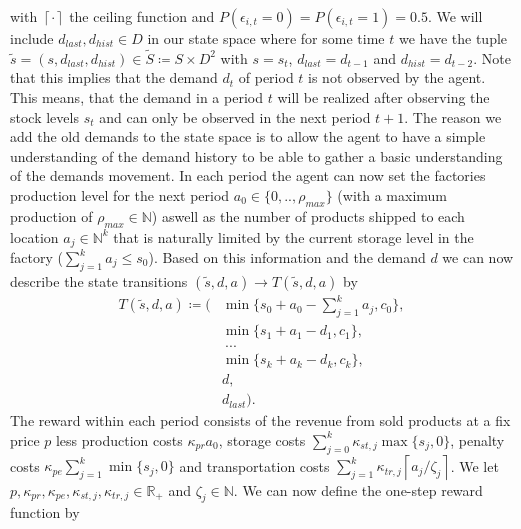\documentclass[journal, a4paper]{IEEEtran}
\theoremstyle{plain}
\theoremstyle{definition}
\begin{document}
with $\left\lceil \cdot \right\rceil$ the ceiling function and $P(\epsilon_{i,t}=0) = P(\epsilon_{i,t}=1) = 0.5$. We will include $d_{last}, d_{hist} \in D$ in our state space where for some time $t$ we have the tuple $\tilde{s} = (s, d_{last}, d_{hist}) \in \tilde{S} \coloneqq S \times D^2$ with $s = s_t$, $d_{last} = d_{t-1}$ and $d_{hist} = d_{t-2}$. Note that this implies that the demand $d_t$ of period $t$ is not observed by the agent. This means, that the demand in a period $t$ will be realized after observing the stock levels $s_t$ and can only be observed in the next period $t+1$.
The reason we add the old demands to the state space is to allow the agent to have a simple understanding of the demand history to be able to gather a basic understanding of the demands movement. In each period the agent can now set the factories production level for the next period $a_0 \in \{0,.., \rho_{max}\}$ (with a maximum production of $\rho_{max} \in \mathbb{N}$) aswell as the number of products shipped to each location $a_j \in \mathbb{N}^k$ that is naturally limited by the current storage level in the factory ($\sum_{j=1}^{k}a_j \leq s_0$). Based on this information and the demand $d$ we can now describe the state transitions $(\tilde{s}, d, a) \rightarrow T(\tilde{s},d,a)$ by
\begin{equation}
\label{eq:transition_function}
	\begin{split}
		T(\tilde{s}, d, a) \coloneqq (&\min\{s_0 + a_0 - \sum_{j=1}^{k}a_j, c_0 \}, \\
		&\min\{s_1 + a_1 - d_1, c_1 \}, \\
		&\ ... \\
		&\min\{s_k + a_k - d_k, c_k \}, \\
		&d, \\
		&d_{last}).
\end{split}
\end{equation}
The reward within each period consists of the revenue from sold products at a fix price $p$ less production costs $\kappa_{pr}a_0$, storage costs $\sum_{j=0}^{k}\kappa_{st,j} \max\{s_j, 0\}$, penalty costs $\kappa_{pe} \sum_{j=1}^{k}\min\{s_j,0\}$ and transportation costs $\sum_{j=1}^{k} \kappa_{tr, j} \left\lceil a_j / \zeta_j \right\rceil$. We let $p, \kappa_{pr}, \kappa_{pe}, \kappa_{st, j}, \kappa_{tr,j} \in \mathbb{R}_+$ and $\zeta_j \in \mathbb{N}$. We can now define the one-step reward function by
\end{document}
